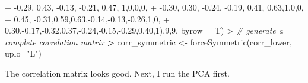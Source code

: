 \documentclass[
]{article}
\newenvironment{Shaded}{\begin{snugshade}}{\end{snugshade}}
\newcommand{\AttributeTok}[1]{\textcolor[rgb]{0.77,0.63,0.00}{#1}}
\newcommand{\CommentTok}[1]{\textcolor[rgb]{0.56,0.35,0.01}{\textit{#1}}}
\newcommand{\DecValTok}[1]{\textcolor[rgb]{0.00,0.00,0.81}{#1}}
\newcommand{\ErrorTok}[1]{\textcolor[rgb]{0.64,0.00,0.00}{\textbf{#1}}}
\newcommand{\FloatTok}[1]{\textcolor[rgb]{0.00,0.00,0.81}{#1}}
\newcommand{\FunctionTok}[1]{\textcolor[rgb]{0.00,0.00,0.00}{#1}}
\newcommand{\NormalTok}[1]{#1}
\newcommand{\OtherTok}[1]{\textcolor[rgb]{0.56,0.35,0.01}{#1}}
\newcommand{\SpecialCharTok}[1]{\textcolor[rgb]{0.00,0.00,0.00}{#1}}
\newcommand{\StringTok}[1]{\textcolor[rgb]{0.31,0.60,0.02}{#1}}
\begin{document}
\begin{Shaded}
\begin{Highlighting}[]
\SpecialCharTok{+}                       \SpecialCharTok{{-}}\FloatTok{0.29}\NormalTok{, }\FloatTok{0.43}\NormalTok{, }\SpecialCharTok{{-}}\FloatTok{0.13}\NormalTok{, }\SpecialCharTok{{-}}\FloatTok{0.21}\NormalTok{, }\FloatTok{0.47}\NormalTok{, }\DecValTok{1}\NormalTok{,}\DecValTok{0}\NormalTok{,}\DecValTok{0}\NormalTok{,}\DecValTok{0}\NormalTok{,}
\SpecialCharTok{+}                       \SpecialCharTok{{-}}\FloatTok{0.30}\NormalTok{, }\FloatTok{0.30}\NormalTok{, }\SpecialCharTok{{-}}\FloatTok{0.24}\NormalTok{, }\SpecialCharTok{{-}}\FloatTok{0.19}\NormalTok{, }\FloatTok{0.41}\NormalTok{, }\FloatTok{0.63}\NormalTok{,}\DecValTok{1}\NormalTok{,}\DecValTok{0}\NormalTok{,}\DecValTok{0}\NormalTok{, }
\SpecialCharTok{+}                       \FloatTok{0.45}\NormalTok{, }\SpecialCharTok{{-}}\FloatTok{0.31}\NormalTok{,}\FloatTok{0.59}\NormalTok{,}\FloatTok{0.63}\NormalTok{,}\SpecialCharTok{{-}}\FloatTok{0.14}\NormalTok{,}\SpecialCharTok{{-}}\FloatTok{0.13}\NormalTok{,}\SpecialCharTok{{-}}\FloatTok{0.26}\NormalTok{,}\DecValTok{1}\NormalTok{,}\DecValTok{0}\NormalTok{,}
\SpecialCharTok{+}                       \FloatTok{0.30}\NormalTok{,}\SpecialCharTok{{-}}\FloatTok{0.17}\NormalTok{,}\SpecialCharTok{{-}}\FloatTok{0.32}\NormalTok{,}\FloatTok{0.37}\NormalTok{,}\SpecialCharTok{{-}}\FloatTok{0.24}\NormalTok{,}\SpecialCharTok{{-}}\FloatTok{0.15}\NormalTok{,}\SpecialCharTok{{-}}\FloatTok{0.29}\NormalTok{,}\FloatTok{0.40}\NormalTok{,}\DecValTok{1}\NormalTok{),}\DecValTok{9}\NormalTok{,}\DecValTok{9}\NormalTok{, }\AttributeTok{byrow =}\NormalTok{ T)}
\SpecialCharTok{\textgreater{}} \CommentTok{\# generate a complete correlation matrix}
\ErrorTok{\textgreater{}}\NormalTok{ corr\_symmetric }\OtherTok{\textless{}{-}} \FunctionTok{forceSymmetric}\NormalTok{(corr\_lower, }\AttributeTok{uplo=}\StringTok{"L"}\NormalTok{)}
\end{Highlighting}
\end{Shaded}

The correlation matrix looks good. Next, I run the PCA first.
\end{document}
